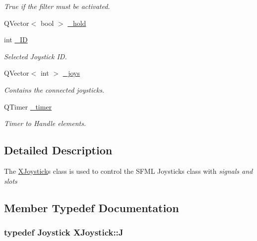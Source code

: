 \begin{DoxyCompactItemize}
\begin{DoxyCompactList}\small\item\em True if the filter must be activated. \end{DoxyCompactList}\item 
Q\+Vector$<$ bool $>$ \hyperlink{class_x_joystick_a2cece971d24e1970176a2271b7f14a2d}{\+\_\+hold}
\item 
int \hyperlink{class_x_joystick_a9916e0cad47852ca6fedcac461c3457b}{\+\_\+\+I\+D}
\begin{DoxyCompactList}\small\item\em Selected Joystick I\+D. \end{DoxyCompactList}\item 
Q\+Vector$<$ int $>$ \hyperlink{class_x_joystick_a50c3a87dac7c883a1865e5c2b4cdabfd}{\+\_\+joys}
\begin{DoxyCompactList}\small\item\em Contains the connected joysticks. \end{DoxyCompactList}\item 
Q\+Timer \hyperlink{class_x_joystick_ac2748a746ebdf779cf54fe761bfbfa0b}{\+\_\+timer}
\begin{DoxyCompactList}\small\item\em Timer to Handle elements. \end{DoxyCompactList}\end{DoxyCompactItemize}


\subsection{Detailed Description}
The \hyperlink{class_x_joystick}{X\+Joystick}\textquotesingle{}s class is used to control the S\+F\+M\+L Joystick\textquotesingle{}s class with {\itshape signals and slots} 

\subsection{Member Typedef Documentation}
\hypertarget{class_x_joystick_a1d950bf7d2e82cc023030cb8d77821b7}{}
\subsubsection[{J}]{\setlength{\rightskip}{0pt plus 5cm}typedef Joystick {\bf X\+Joystick\+::\+J}\hspace{0.3cm}{\ttfamily [private]}}\label{class_x_joystick_a1d950bf7d2e82cc023030cb8d77821b7}



